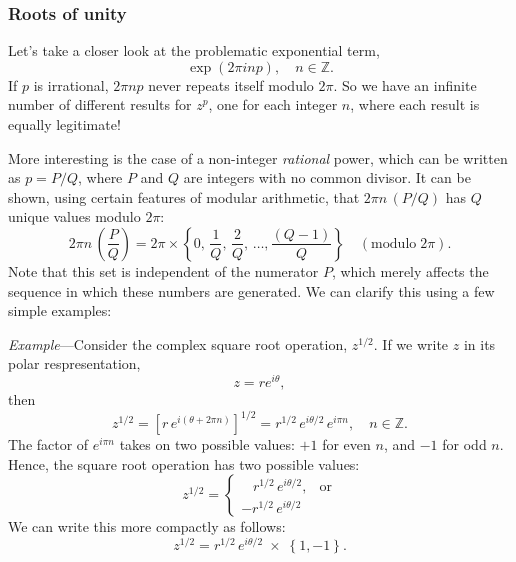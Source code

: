 \documentclass[10pt,a4paper]{article}
\begin{document}
\subsubsection{Roots of unity}\label{roots-of-unity}

Let's take a closer look at the problematic exponential term,
\begin{equation}
\exp\left(2\pi i np\right), \quad n \in \mathbb{Z}.
\end{equation}
If $p$ is irrational, $2\pi np$ never repeats itself modulo
$2\pi$. So we have an infinite number of different results for
$z^p$, one for each integer $n$, where each result is equally
legitimate!

More interesting is the case of a non-integer \emph{rational} power,
which can be written as $p = P/Q$, where $P$ and $Q$ are integers
with no common divisor. It can be shown, using certain features of
modular arithmetic, that $2\pi n\, (P/Q)$ has $Q$ unique values
modulo $2\pi$:
\begin{equation}
 2\pi n\, \left(\frac{P}{Q}\right) = 2\pi \times \left\{0,\, \frac{1}{Q},\, \frac{2}{Q},\, \dots, \frac{(Q-1)}{Q} \right\} \quad(\mathrm{modulo} \; 2\pi).
\end{equation}
Note that this set is independent of the numerator $P$, which merely
affects the sequence in which these numbers are generated. We can
clarify this using a few simple examples:

\begin{framed} \noindent
\textit{Example}---Consider the complex square root operation,
$z^{1/2}$. If we write $z$ in its polar respresentation,
\begin{equation}
  z = r e^{i\theta},
\end{equation}
then
\begin{equation}
  z^{1/2} = \left[r \, e^{i(\theta + 2 \pi n)} \right]^{1/2} = r^{1/2} \, e^{i\theta/2} \, e^{i \pi n}, \quad n \in \mathbb{Z}.
\end{equation}
The factor of $e^{i\pi n}$ takes on two possible values: $+1$ for even
$n$, and $-1$ for odd $n$. Hence, the square root operation has two
possible values:
\begin{equation}
  z^{1/2} = \left\{\begin{array}{ll}\;\;\; r^{1/2} \, e^{i\theta/2}, & \mathrm{or} \\ -r^{1/2} \, e^{i\theta/2} &\end{array}\right.
\end{equation}
We can write this more compactly as follows:
\begin{equation}
  z^{1/2} = r^{1/2} \, e^{i\theta/2} \;\times\; \left\{1, -1\right\}.
\end{equation}
\end{framed}
\end{document}
